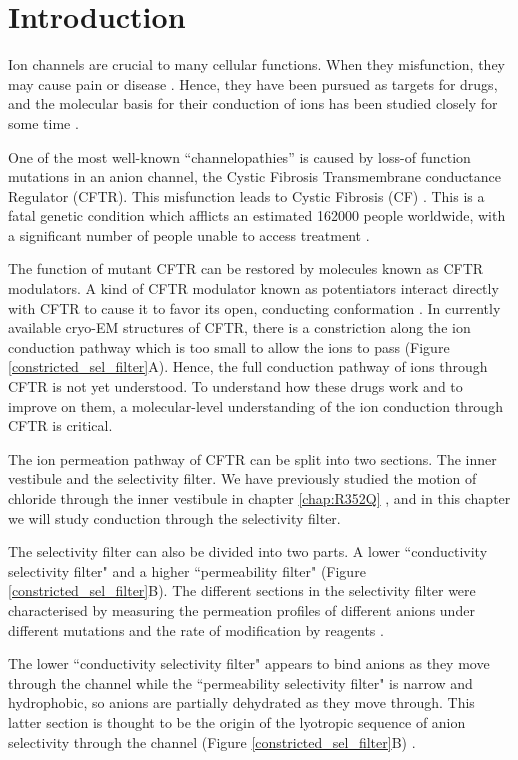 \section{Introduction}

Ion channels are crucial to many cellular functions. When they misfunction, they may cause pain or disease \cite{kingwell2019, kim2014}. Hence, they have been pursued as targets for drugs, and the molecular basis for their conduction of ions has been studied closely for some time \cite{santos2017, doyle1998, roux1993}.

One of the most well-known ``channelopathies'' is caused by loss-of function mutations in an anion channel, the Cystic Fibrosis Transmembrane conductance Regulator (CFTR). This misfunction leads to Cystic Fibrosis (CF) \cite{riordan1989,gadsby2006}. This is a fatal genetic condition which afflicts an estimated 162000 people worldwide, with a significant number of people unable to access treatment \cite{guo2022}.

The function of mutant CFTR can be restored by molecules known as CFTR modulators. A kind of CFTR modulator known as potentiators interact directly with CFTR to cause it to favor its open, conducting conformation \cite{liu2019}. In currently available cryo-EM structures of CFTR, there is a constriction along the ion conduction pathway which is too small to allow the ions to pass \cite{zhang2018} (Figure \ref{constricted_sel_filter}A). Hence, the full conduction pathway of ions through CFTR is not yet understood. To understand how these drugs work and to improve on them, a molecular-level understanding of the ion conduction through CFTR is critical.

The ion permeation pathway of CFTR can be split into two sections. The inner vestibule and the selectivity filter. We have previously studied the motion of chloride through the inner vestibule in chapter \ref{chap:R352Q} \cite{wong2022a}, and in this chapter we will study conduction through the selectivity filter.

The selectivity filter can also be divided into two parts. A lower ``conductivity selectivity filter" and a higher ``permeability filter" (Figure \ref{constricted_sel_filter}B). The different sections in the selectivity filter were characterised by measuring the permeation profiles of different anions under different mutations and the rate of modification by reagents \cite{elhiani2010, linsdell2016}. 

The lower ``conductivity selectivity filter" appears to bind anions as they move through the channel while the ``permeability selectivity filter" is narrow and hydrophobic, so anions are partially dehydrated as they move through. This latter section is thought to be the origin of the lyotropic sequence of anion selectivity through the channel (Figure \ref{constricted_sel_filter}B) \cite{linsdell2021}. 

